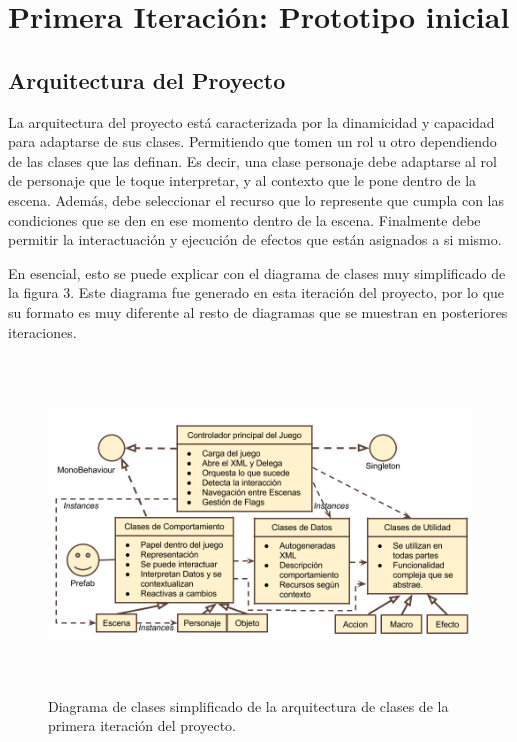 \chapter{Primera Iteración: Prototipo inicial}

\section{Arquitectura del Proyecto}
\label{it1arquitectura}
La arquitectura del proyecto está caracterizada por la dinamicidad y capacidad para adaptarse de sus clases. Permitiendo que tomen un rol u otro dependiendo de las clases que las definan. Es decir, una clase personaje debe adaptarse al rol de personaje que le toque interpretar, y al contexto que le pone dentro de la escena. Además, debe seleccionar el recurso que lo represente que cumpla con las condiciones que se den en ese momento dentro de la escena. Finalmente debe permitir la interactuación y ejecución de efectos que están asignados a si mismo.

En esencial, esto se puede explicar con el diagrama de clases muy simplificado de la figura 3. Este diagrama fue generado en esta iteración del proyecto, por lo que su formato es muy diferente al resto de diagramas que se muestran en posteriores iteraciones.

\begin{figure}[htb]
	\includegraphics[height=3.5in]{figures/arquitecturait1.png}
	\caption[Arquitectura simplificada - Prototipo 1]{Diagrama de clases simplificado de la arquitectura de clases de la primera iteración del proyecto.}
	\label{arquitecturait1}
\end{figure}


